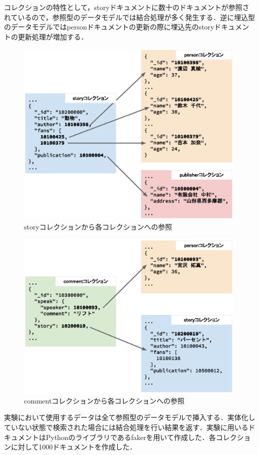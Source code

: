 \documentclass[a4paper,11pt]{ujreport}
\begin{document}
コレクションの特性として，storyドキュメントに数十のドキュメントが参照されているので，参照型のデータモデルでは結合処理が多く発生する．逆に埋込型のデータモデルではpersonドキュメントの更新の際に埋込先のstoryドキュメントの更新処理が増加する．

\begin{figure}[htbp]
	\begin{center}
		\includegraphics[width=30em, trim=10em 2em 10em 0]{src/ExperimentCollection.eps} %
	\end{center}
	\caption{storyコレクションから各コレクションへの参照}
	\label{figure:ExperimentCollection}
\end{figure}
\begin{figure}[htbp]
	\begin{center}
		\includegraphics[width=30em, trim=10em 2em 10em 2em]{src/ExperimentCollection2.eps} %
	\end{center}
	\caption{commentコレクションから各コレクションへの参照}
	\label{figure:ExperimentCollection2}
\end{figure}
実験において使用するデータは全て参照型のデータモデルで挿入する．実体化していない状態で検索された場合には結合処理を行い結果を返す．実験に用いるドキュメントはPythonのライブラリであるfaker\cite{faker}を用いて作成した．各コレクションに対して1000ドキュメントを作成した．
\end{document}
